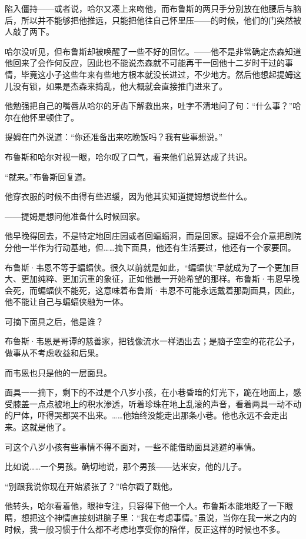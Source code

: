 \documentclass[../main]{subfiles}
\begin{document}
陷入僵持——或者说，哈尔又凑上来吻他，而布鲁斯的两只手分别放在他腰后与脑后，所以并不能够把他推远，只能把他往自己怀里压——的时候，他们的门突然被人敲了两下。

哈尔没听见，但布鲁斯却被唤醒了一些不好的回忆。——他不是非常确定杰森知道他回来了会作何反应，因此也不能说杰森就不可能再干一回他十二岁时干过的事情，毕竟这小子这些年来有些地方根本就没长进过，不少地方。然后他想起提姆这儿没有锁，如果是杰森来捣乱，他大概就会直接推门进来了。

他勉强把自己的嘴唇从哈尔的牙齿下解救出来，吐字不清地问了句：“什么事？”哈尔在他怀里顿住了。

提姆在门外说道：“你还准备出来吃晚饭吗？我有些事想说。”

布鲁斯和哈尔对视一眼，哈尔叹了口气，看来他们总算达成了共识。

“就来。”布鲁斯回复道。

他穿衣服的时候不由得有些迟缓，因为他其实知道提姆想说些什么。

——提姆是想问他准备什么时候回家。

他早晚得回去，不是特定地回庄园或者回蝙蝠洞，而是回家。提姆不会介意把剧院分他一半作为行动基地，但……摘下面具，他还有生活要过，他还有一个家要回。

布鲁斯·韦恩不等于蝙蝠侠。很久以前就是如此，“蝙蝠侠”早就成为了一个更加巨大、更加纯粹、更加沉重的象征，正如他最一开始希望的那样。布鲁斯·韦恩早晚会死，而蝙蝠侠不能死，这意味着布鲁斯·韦恩不可能永远戴着那副面具，因此，他不能让自己与蝙蝠侠融为一体。

可摘下面具之后，他是谁？

布鲁斯·韦恩是哥谭的慈善家，把钱像流水一样洒出去；是脑子空空的花花公子，做事从不考虑收益和后果。

而韦恩也只是他的一层面具。

面具一一摘下，剩下的不过是个八岁小孩，在小巷昏暗的灯光下，跪在地面上，感受膝盖一点点被地上的积水渗透，听着珍珠在地上乱滚的声音，看着两具一动不动的尸体，吓得哭都哭不出来。……他始终没能走出那条小巷。他也永远不会走出来。这就是他了。

可这个八岁小孩有些事情不得不面对，一些不能借助面具逃避的事情。

比如说……一个男孩。确切地说，那个男孩——达米安，他的儿子。

“别跟我说你现在开始紧张了？”哈尔戳了戳他。

他转头，哈尔看着他，眼神专注，只容得下他一个人。布鲁斯本能地眨了一下眼睛，想把这个神情直接刻进脑子里：“我在考虑事情。”虽说，当你在我一米之内的时候，我一般习惯于什么都不考虑地享受你的陪伴，反正这样的时候也不多。
\end{document}
